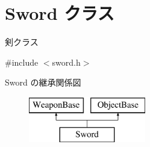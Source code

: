 \hypertarget{class_sword}{}\section{Sword クラス}
\label{class_sword}


剣クラス  




{\ttfamily \#include $<$sword.\+h$>$}

Sword の継承関係図\begin{figure}[H]
\begin{center}
\leavevmode
\includegraphics[height=2.000000cm]{class_sword}
\end{center}
\end{figure}
